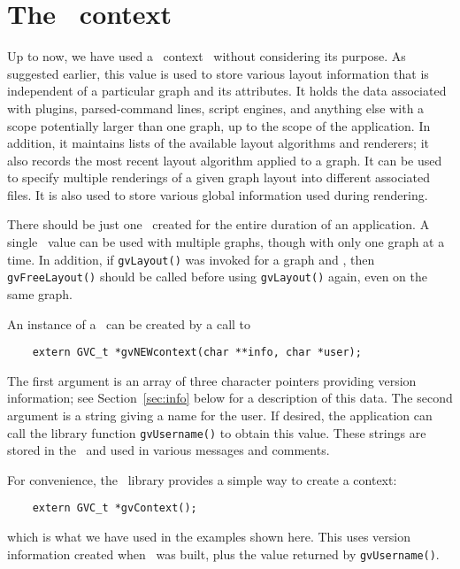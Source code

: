 \section{The \gviz\ context}
\label{sec:gvc}

Up to now, we have used a \gviz\ context \gvc\ without
considering its purpose. As suggested earlier, this value is used
to store various layout information that is independent of a particular
graph and its attributes. 
It holds the data associated with plugins, parsed-command lines, 
script engines, and anything else with a scope potentially larger 
than one graph, up to the scope of the application.
In addition, it maintains lists of the
available layout algorithms and renderers; it also records the most recent
layout algorithm applied to a graph. It can be used to specify multiple
renderings of a given graph layout into different associated files.
It is also used to store various global information used during
rendering.

There should be just one \gvc\ created for the entire 
duration of an application.
A single \gvc\ value can be used with multiple graphs, though
with only one graph at a time. In addition, if {\tt gvLayout()}
was invoked for a graph and \gvc, then {\tt gvFreeLayout()} should
be called before using {\tt gvLayout()} again, even on the same graph.
 
An instance of a \gvc\ can be created by a call to
\begin{verbatim}
    extern GVC_t *gvNEWcontext(char **info, char *user);
\end{verbatim}
The first argument is an array of three character pointers
providing version information; see Section~\ref{sec:info} below for a
description of this data. The second argument is a string giving a
name for the user. If desired, the application can call the library
function {\tt gvUsername()} to obtain this value. These strings
are stored in the \gvc\ and used in various messages and comments.

For convenience, the \gviz\ library provides a simple way to 
create a context:
\begin{verbatim}
    extern GVC_t *gvContext();
\end{verbatim}
which is what we have used in the examples shown here.
This uses version information created when \gviz\ was built, plus
the value returned by {\tt gvUsername()}.

